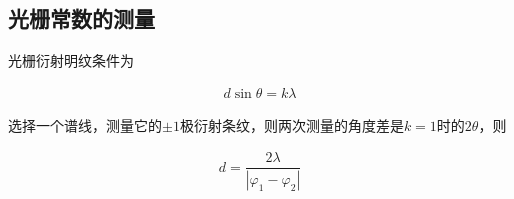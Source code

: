 \documentclass{article}
\begin{document}
\subsection{光栅常数的测量}

光栅衍射明纹条件为

\begin{equation*}
  \begin{aligned}
    d \sin \theta = k \lambda
  \end{aligned}
\end{equation*}

选择一个谱线，测量它的$\pm 1$极衍射条纹，则两次测量的角度差是$k=1$时的$2\theta$，则

\begin{equation*}
  \begin{aligned}
    d= \dfrac{2 \lambda}{\left| \varphi_1 - \varphi_2 \right|} 
  \end{aligned}
\end{equation*}
\end{document}
